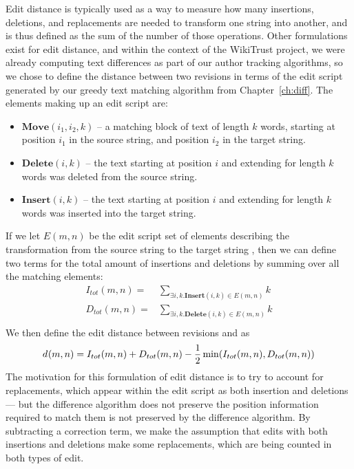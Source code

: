 Edit distance is typically used as a way to measure how many
insertions, deletions, and replacements are needed to transform
one string into another, and is thus defined as the sum of the
number of those operations.
Other formulations exist for edit distance, and within the
context of the WikiTrust project, we were already computing
text differences as part of our author tracking algorithms,
so we chose to define the distance between two revisions
in terms of the edit script generated by our greedy text
matching algorithm from Chapter~\ref{ch:diff}.
The elements making up an edit script are:
\begin{itemize}
\item $\mathbf{Move}(i_1, i_2, k)$ -- a matching block of text of
    length $k$ words, starting at position $i_1$ in the source string,
    and position $i_2$ in the target string.
\item $\mathbf{Delete}(i, k)$ -- the text starting at position $i$
    and extending for length $k$ words was deleted from the source string.
\item $\mathbf{Insert}(i, k)$ -- the text starting at position $i$
    and extending for length $k$ words was inserted into the target string.
\end{itemize}
If we let $E(m,n)$ be the edit script set of elements describing the
transformation from the source string 
to the target string ,
then we can define two terms for the total amount of insertions
and deletions by summing over all the matching elements:
\begin{align*}
  I_{tot}(m,n) =& \sum_{\exists i, k. \mathbf{Insert}(i, k) \in E(m,n)} k \\
  D_{tot}(m,n) =& \sum_{\exists i, k. \mathbf{Delete}(i, k) \in E(m,n)} k \\
\end{align*}
We then define the edit distance between revisions
 and  as
\begin{equation}
    \dist{}{m,n} = I_{tot}(m,n) + D_{tot}(m,n)
        - \frac{1}{2}\min(I_{tot}(m,n), D_{tot}(m,n)) \\
\label{eq:dist}
\end{equation}
The motivation for this formulation of edit distance is
to try to account for replacements, which appear within
the edit script as both insertion and deletions --- but the
difference algorithm does not preserve the
position information required to match them is not preserved
by the difference algorithm.
By subtracting a correction term, we make the assumption
that edits with both insertions and deletions make some
replacements, which are being counted in both types of edit.

